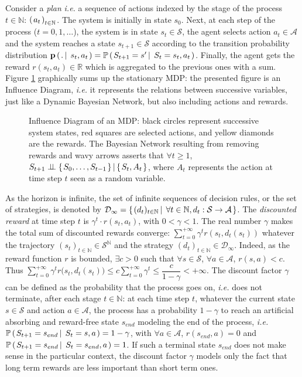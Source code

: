 Consider a \textit{plan} \textit{i.e.} a sequence of actions 
indexed by the stage of the process $t\in \mathbb{N}$: 
$\left( \left. a_t \right. \right)_{t \in \mathbb{N}}$.
The system is initially in state $s_0$. 
Next, at each step of the process ($t=0,1,\ldots$), 
the system is in state $s_t \in \mathcal{S}$, 
the agent selects action $a_t \in \mathcal{A}$ 
and the system reaches a state $s_{t+1} \in \mathcal{S}$ 
according to the transition probability distribution
$\textbf{p} \left( \left.  . \, \right| \left. \, s_t , a_t \right. \right) 
= \mathbb{P} \left( \left.  S_{t+1} = s' \, \right| \left. \, S_t=s_t, a_t  \right. \right)$.
Finally, the agent gets the reward $r(s_{t},a_t) \in \mathbb{R}$ 
which is aggregated to the previous ones
with a sum.
Figure \ref{fig_mdp} graphically sums up 
the stationary MDP: the presented figure is an Influence Diagram,
\textit{i.e.} it represents the relations between successive variables,
just like a Dynamic Bayesian Network, but also including actions and rewards.
\begin{figure}

\caption[Influence Diagram of an MDP]{
Influence Diagram of an MDP:
black circles represent successive system states,
red squares are selected actions,
and yellow diamonds are the rewards.
The Bayesian Network resulting from removing rewards and wavy arrows 
asserts that $\forall t \geqslant 1$, 
$S_{t+1} \perp\!\!\!\perp \left\{ \left.  S_{0}, \ldots, S_{t-1}  \right. \right\} \vert \left\{ \left. S_t,A_t \right. \right\}$,
where $A_t$ represents the action at time step $t$ seen as a random variable.
}
\label{fig_mdp}
\end{figure}

As the horizon is infinite,
the set of infinite sequences of decision rules,
or the set of strategies, 
is denoted by
$\mathcal{D}_{\infty} = \left\{ \left.  (d_t)_{t \in \mathbb{N}} 
\, \right| \left. \, \forall t \in \mathbb{N}, d_t: \mathcal{S} \rightarrow \mathcal{A}  \right. \right\}$.
The \textit{discounted reward} at time step $t$
is $\gamma^{t} \cdot r(s_t,a_t)$, with $0<\gamma<1$.
The real number $\gamma$ makes the total sum of discounted rewards converge:
$\displaystyle \sum_{t=0}^{+ \infty} \gamma^t r(s_t,d_t(s_t)) $
whatever the trajectory $(s_t)_{t \in \mathbb{N}} \in \mathcal{S}^{\mathbb{N}}$
and the strategy $(d_t)_{t \in \mathbb{N}} \in \mathcal{D}_{\infty}$.
Indeed, as the reward function $r$ is bounded, 
$\exists c>0$ such that $\forall s \in \mathcal{S}$, $\forall a \in \mathcal{A}$, $r(s,a)<c$.
Thus $\displaystyle \sum_{t=0}^{+ \infty} \gamma^t r\Big(s_t,d_t(s_t)\Big) \leqslant c \sum_{t=0}^{+\infty} \gamma^t \leqslant \dfrac{c}{1-\gamma}  < + \infty$.
The discount factor $\gamma$ can be defined as the probability 
that the process goes on, \textit{i.e.} does not terminate, 
after each stage $t \in \mathbb{N}$: 
at each time step $t$, whatever the current state $s \in \mathcal{S}$
and action $a \in \mathcal{A}$, 
the process has a probability $1 - \gamma$
to reach an artificial absorbing and reward-free state $s_{end}$ 
modeling the end of the process,
\textit{i.e.} $\mathbb{P} \left( \left.  S_{t+1} = s_{end} \, \right| \left. \, S_t = s, a   \right. \right) = 1 - \gamma$,
with $\forall a \in \mathcal{A}$,
$r(s_{end},a)=0$ and $\mathbb{P} \left( \left.  S_{t+1} = s_{end} \, \right| \left. \, S_t = s_{end}, a  \right. \right) = 1$.
If such a terminal state $s_{end}$ does not make sense in the particular context,
the discount factor $\gamma$ models only the fact that
long term rewards are less important than short term ones. 


